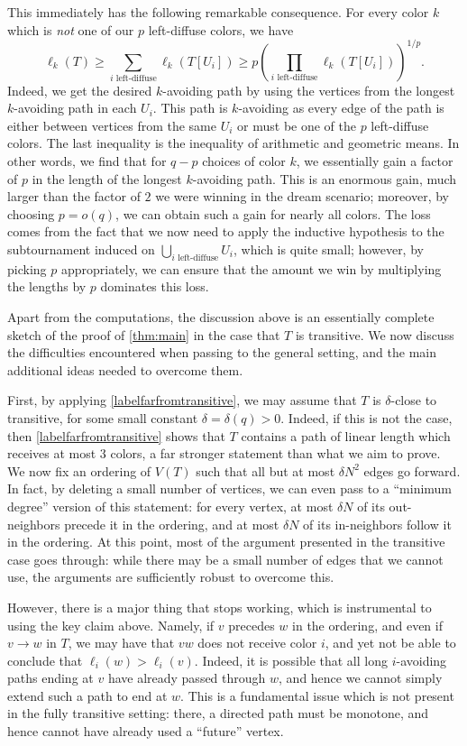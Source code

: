 \documentclass[11pt,reqno]{amsart}
\theoremstyle{definition}
\newcommand\1{\mathbf{1}}
\let\geq\geqslant
\begin{document}
This immediately has the following remarkable consequence. For every color $k$ which is \emph{not} one of our $p$ left-diffuse colors, we have
\[
    \ell_k(T) \geq \sum_{i\text{ left-diffuse}} \ell_k(T[U_i]) \geq p\left(\prod_{i\text{ left-diffuse}} \ell_k(T[U_i])\right)^{1/p}.
\]
Indeed, we get the desired $k$-avoiding path by using the vertices from the longest $k$-avoiding path in each $U_i$. This path is $k$-avoiding as every edge of the path is either between vertices from the same $U_i$ or must be one of the $p$ left-diffuse colors. The last inequality is the inequality of arithmetic and geometric means. In other words, we find that for $q-p$ choices of color $k$, we essentially gain a factor of $p$ in the length of the longest $k$-avoiding path. This is an enormous gain, much larger than the factor of $2$ we were winning in the dream scenario; moreover, by choosing $p = o(q)$, we can obtain such a gain for nearly all colors. The loss comes from the fact that we now need to apply the inductive hypothesis to the subtournament induced on $\bigcup_{i \text{ left-diffuse}} U_i$, which is quite small; however, by picking $p$ appropriately, we can ensure that the amount we win by multiplying the lengths by $p$ dominates this loss.

Apart from the computations, the discussion above is an essentially complete sketch of the proof of \cref{thm:main} in the case that $T$ is transitive. We now discuss the difficulties encountered when passing to the general setting, and the main additional ideas needed to overcome them. 

First, by applying \cref{labelfarfromtransitive}, we may assume that $T$ is $\delta$-close to transitive, for some small constant $\delta=\delta(q)>0$. Indeed, if this is not the case, then \cref{labelfarfromtransitive} shows that $T$ contains a path of linear length which receives at most $3$ colors, a far stronger statement than what we aim to prove. We now fix an ordering of $V(T)$ such that all but at most $\delta N^2$ edges go forward. In fact, by deleting a small number of vertices, we can even pass to a ``minimum degree'' version of this statement: for every vertex, at most $\delta N$ of its out-neighbors precede it in the ordering, and at most $\delta N$ of its in-neighbors follow it in the ordering. At this point, most of the argument presented in the transitive case goes through: while there may be a small number of edges that we cannot use, the arguments are sufficiently robust to overcome this.

However, there is a major thing that stops working, which is instrumental to using the key claim above. Namely, if $v$ precedes $w$ in the ordering, and even if $v \to w$ in $T$, we may have that $vw$ does not receive color $i$, and yet not be able to conclude that $\ell_i(w)>\ell_i(v)$. Indeed, it is possible that all long  $i$-avoiding paths ending at $v$ have already passed through $w$, and hence we cannot simply extend such a path to end at $w$. This is a fundamental issue
which is not present in the fully transitive setting: there, a directed path must be monotone, and hence cannot have already used a ``future'' vertex. 
\end{document}
